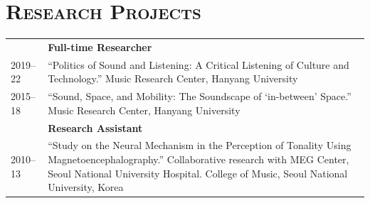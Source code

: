 \documentclass[a4paper,11pt,draft]{article}
\begin{document}
\begin{tabular}{p{2.5cm} p{12.5cm}}
    
    
  \end{tabular}
  
  \vspace*{5mm}
  
  \section*{\textsc{Research Projects}}
  
  \hspace*{-0.25cm}
  \begin{tabular}{p{2.5cm} p{12.5cm}}
    & \textbf{Full-time Researcher}\\
    2019--22 & ``Politics of Sound and Listening: A Critical Listening of Culture and
    Technology.'' Music Research Center, Hanyang University\\
    2015--18 & ``Sound, Space, and Mobility: The Soundscape of ‘in-between’ Space.'' Music Research Center, Hanyang University\\[2mm]
    & \textbf{Research Assistant}\\
    2010--13 & ``Study on the Neural Mechanism in the Perception of Tonality Using Magnetoencephalography.'' Collaborative research with MEG Center, Seoul National University Hospital. College of Music, Seoul National University, Korea
  \end{tabular}
  
\end{document}
